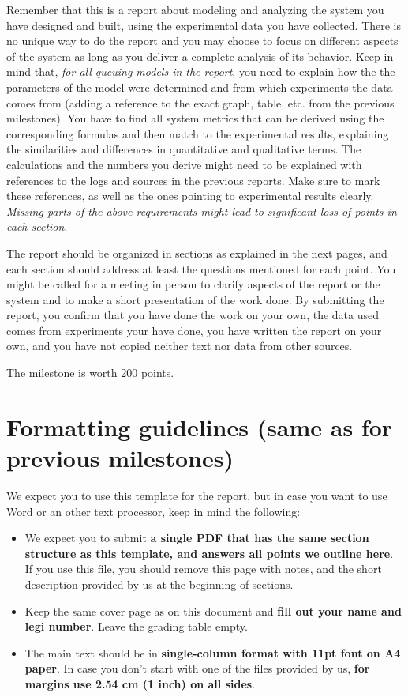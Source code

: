 \documentclass[11pt]{article}
\begin{document}
Remember  that  this is  a  report  about modeling  and  analyzing the  system you  have  designed  and  built, using  the experimental data you have collected. There is no unique way to do the report and you may choose  to  focus  on  different  aspects  of  the  system  as  long  as  you deliver a  complete analysis of  its behavior. Keep in mind that, \emph{for all queuing models in the report}, you need to explain how the the parameters of the model were determined and from which experiments the data comes from (adding a reference to the exact graph, table, etc. from the previous milestones). You have to find all system metrics that can be derived using the corresponding formulas and then match to the experimental results, explaining the similarities and differences in quantitative and qualitative terms. The calculations and the numbers you derive might need to be explained with references to the logs and sources in the previous reports. Make sure to mark these references, as well as the ones pointing to experimental results clearly. \textit{Missing parts of the above requirements might lead to significant loss of points in each section.}

The report should be organized in sections as explained in the next pages, and each section should address at least the questions mentioned for each point. You might be called for a meeting in person to clarify aspects of the report or the system and to make a short presentation of the work done. By submitting the report, you  confirm  that  you  have  done  the  work  on  your  own,  the  data used comes  from  experiments  your have  done,  you  have  written  the  report  on  your  own,  and  you have  not  copied  neither text nor data from other sources.

\medskip
The milestone is worth 200 points. 

\section*{Formatting guidelines (same as for previous milestones)}
We expect you to use this template for the report, but in case you want to use Word or an other text processor, keep in mind the following:
\begin{itemize}
\item  We expect you to submit \textbf{a single PDF that has the same section structure as this template, and answers all points we outline here}. If you use this file, you should remove this page with notes, and the short description provided by us at the beginning of sections.
\item Keep the same cover page as on this document and \textbf{fill out your name and legi number}. Leave the grading table empty.
\item  The main text should be in \textbf{single-column format with 11pt font on A4 paper}. In case you don't start with one of the files provided by us, \textbf{for margins use 2.54 cm (1 inch) on all sides}.
\end{itemize}
\end{document}
